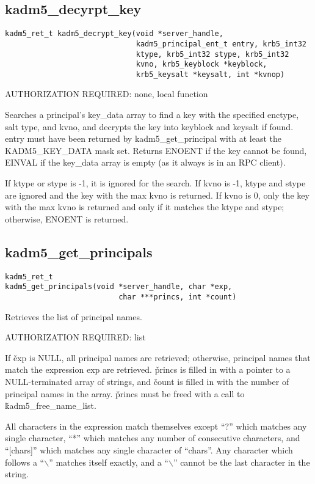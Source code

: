 \subsection{kadm5_decyrpt_key}

\begin{verbatim}
kadm5_ret_t kadm5_decrypt_key(void *server_handle,
                              kadm5_principal_ent_t entry, krb5_int32
                              ktype, krb5_int32 stype, krb5_int32
                              kvno, krb5_keyblock *keyblock,
                              krb5_keysalt *keysalt, int *kvnop)
\end{verbatim}

AUTHORIZATION REQUIRED: none, local function

Searches a principal's key_data array to find a key with the specified
enctype, salt type, and kvno, and decrypts the key into keyblock and
keysalt if found.  entry must have been returned by
kadm5_get_principal with at least the KADM5_KEY_DATA mask set.
Returns ENOENT if the key cannot be found, EINVAL if the key_data
array is empty (as it always is in an RPC client).

If ktype or stype is -1, it is ignored for the search.  If kvno is -1,
ktype and stype are ignored and the key with the max kvno is returned.
If kvno is 0, only the key with the max kvno is returned and only if
it matches the ktype and stype; otherwise, ENOENT is returned.

\subsection{kadm5_get_principals}

\begin{verbatim}
kadm5_ret_t
kadm5_get_principals(void *server_handle, char *exp,
                          char ***princs, int *count)
\end{verbatim}

Retrieves the list of principal names.  

AUTHORIZATION REQUIRED: list

If \v{exp} is NULL, all principal names are retrieved; otherwise,
principal names that match the expression exp are retrieved.
\v{princs} is filled in with a pointer to a NULL-terminated array of
strings, and \v{count} is filled in with the number of principal names
in the array.  \v{princs} must be freed with a call to
\v{kadm5_free_name_list}.

All characters in the expression match themselves except ``?'' which
matches any single character, ``*'' which matches any number of
consecutive characters, and ``[chars]'' which matches any single
character of ``chars''. Any character which follows a ``$\backslash$''
matches itself exactly, and a ``$\backslash$'' cannot be the last
character in the string.

